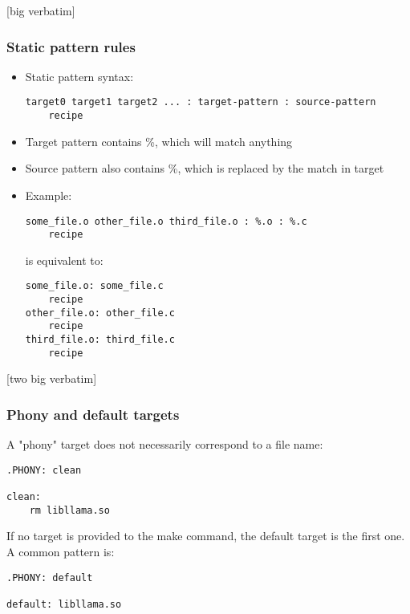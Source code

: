\documentclass[12pt]{article}
\begin{document}
[big verbatim]

\subsubsection{Static pattern rules}
\begin{itemize}
    \item Static pattern syntax:
    \begin{verbatim}
target0 target1 target2 ... : target-pattern : source-pattern
    recipe
    \end{verbatim}
    
    \item Target pattern contains \%, which will match anything
    \item Source pattern also contains \%, which is replaced by the match in target
    \item Example:
    \begin{verbatim}
some_file.o other_file.o third_file.o : %.o : %.c
    recipe
    \end{verbatim}
    is equivalent to:
    \begin{verbatim}
some_file.o: some_file.c
    recipe
other_file.o: other_file.c
    recipe
third_file.o: third_file.c
    recipe
    \end{verbatim}
\end{itemize}
[two big verbatim]

\subsubsection{Phony and default targets}

A "phony" target does not necessarily correspond to a file name:

\begin{verbatim}
.PHONY: clean

clean:
    rm libllama.so
\end{verbatim}

If no target is provided to the make command, the default target is the first one. A common pattern is:

\begin{verbatim}
.PHONY: default

default: libllama.so
\end{verbatim}
\end{document}
